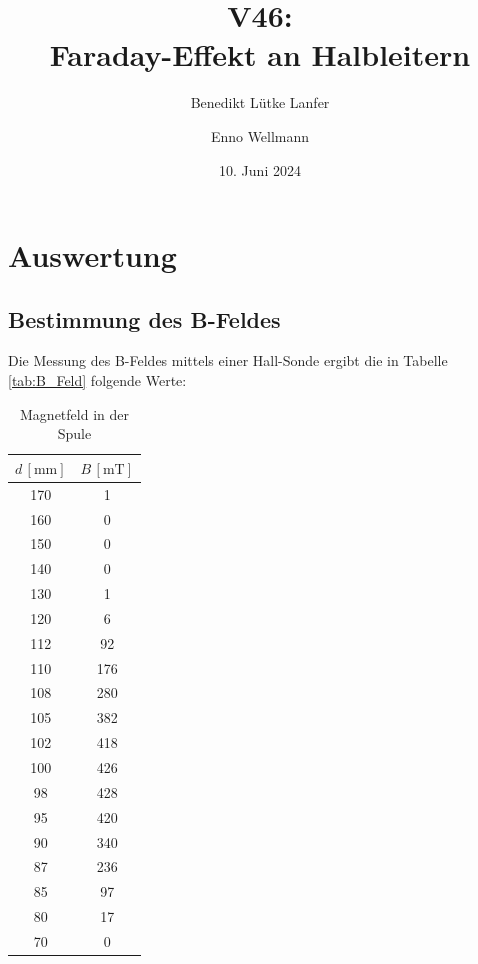 

\title{V46:\\ Faraday-Effekt an Halbleitern}
\author{Benedikt Lütke Lanfer \and Enno Wellmann}
\date{10. Juni 2024}
\publishers{TU Dortmund – Fakultät Physik}



\tableofcontents
\newpage







\text{}
\newpage
\section{Auswertung}
\subsection{Bestimmung des B-Feldes}
Die Messung des B-Feldes mittels einer Hall-Sonde ergibt die in Tabelle \eqref{tab:B_Feld} folgende Werte:

\begin{table}[H]
	\centering
    \label{tab:B_Feld}
	\begin{tabular}{c c}
		\toprule
		$d \, [\unit{\milli\meter}]$ & $B \, [\unit{\milli\tesla}] $  \\
		\midrule
        170 & 1 \\
        160 & 0 \\
        150 & 0 \\
        140 & 0 \\
        130 & 1 \\
        120 & 6 \\
        112 & 92 \\
        110 & 176 \\
        108 & 280 \\
        105 & 382 \\
        102 & 418 \\
        100 & 426 \\
        98  & 428 \\
        95  & 420 \\
        90  & 340 \\
        87  & 236 \\
        85  & 97 \\
        80  & 17 \\
        70  & 0  \\
		\bottomrule
	\end{tabular}
    \caption{Magnetfeld in der Spule}\label{tab:B_Feld}
\end{table}

